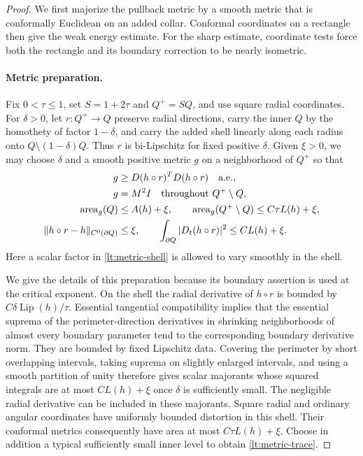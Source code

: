 \documentclass[11pt]{article}
\numberwithin{equation}{section}
\theoremstyle{definition}
\theoremstyle{remark}
\begin{document}
\begin{proof}
We first majorize the pullback metric by a smooth metric that is
conformally Euclidean on an added collar. Conformal coordinates on a
rectangle then give the weak energy estimate. For the sharp estimate,
coordinate tests force both the rectangle and its boundary correction
to be nearly isometric.

\paragraph{Metric preparation.}
Fix $0<\tau\leq1$, set $S=1+2\tau$ and
$Q^+=SQ$, and use square radial coordinates.  For $\delta>0$, let
$r:Q^+\to Q$ preserve radial directions, carry the inner $Q$ by the
homothety of factor $1-\delta$, and carry the added shell linearly along
each radius onto $Q\setminus(1-\delta)Q$.  Thus $r$ is bi-Lipschitz
for fixed positive $\delta$.  Given $\xi>0$, we may choose $\delta$
and a smooth positive metric $g$ on a neighborhood of $Q^+$ so that
\begin{align}
 g&\geq D(h\circ r)^TD(h\circ r)\quad\hbox{a.e.},
       \label{lt:metric-dominates}\\
 g&=M^2I\quad\hbox{throughout }Q^+\setminus Q,
       \label{lt:metric-shell}\\
 \operatorname{area}_g(Q)&\leq A(h)+\xi,
 \qquad
 \operatorname{area}_g(Q^+\setminus Q)
       \leq C\tau L(h)+\xi,                 \label{lt:metric-area}\\
 \|h\circ r-h\|_{C^0(\partial Q)}&\leq\xi,
 \qquad
 \int_{\partial Q}|D_t(h\circ r)|^2
       \leq CL(h)+\xi.                    \label{lt:metric-trace}
\end{align}
Here a scalar factor in \eqref{lt:metric-shell} is allowed to vary
smoothly in the shell.

We give the details of this preparation because its boundary assertion
is used at the critical exponent.  On the shell the radial derivative
of $h\circ r$ is bounded by $C\delta\operatorname{Lip}(h)/\tau$.  Essential
tangential compatibility implies that the essential suprema of the
perimeter-direction derivatives in shrinking neighborhoods of almost
every boundary parameter tend to the corresponding boundary derivative
norm.  They are bounded by fixed Lipschitz data.  Covering the perimeter
by short overlapping intervals, taking suprema on slightly enlarged
intervals, and using a smooth partition of unity therefore gives scalar
majorants whose squared integrals are at most $CL(h)+\xi$ once
$\delta$ is sufficiently small.  The negligible radial derivative can
be included in these majorants.  Square radial and ordinary angular
coordinates have uniformly bounded distortion in this shell.  Their
conformal metrics consequently have area at most $C\tau L(h)+\xi$.
Choose in addition a typical sufficiently small inner level to obtain
\eqref{lt:metric-trace}.


\end{proof}
\end{document}
